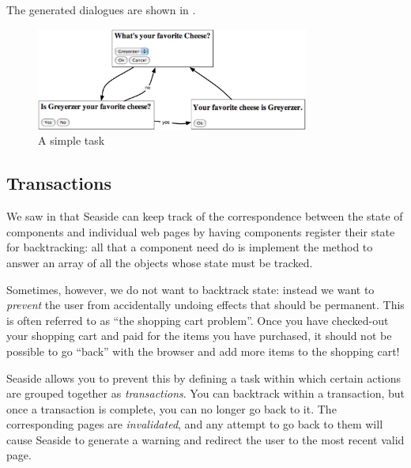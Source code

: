 \documentclass[a4paper,10pt,twoside]{book}
\begin{document}
The generated dialogues are shown in .

\begin{figure}[ht]
\begin{center}
\includegraphics[width=0.8\textwidth]{chooseCheese}
\caption{A simple task}
\label{fig:chooseCheese}
\end{center}
\end{figure}

\subsection{Transactions}

We saw in  that Seaside can keep track of the correspondence between the state of components and individual web pages by having components register their state for backtracking:
all that a component need do is implement the method  to answer an array of all the objects whose state must be tracked.

Sometimes, however, we do not want to backtrack state: instead we want to \emph{prevent} the user from accidentally undoing effects that should be permanent.
This is often referred to as ``the shopping cart problem''.
Once you have checked-out your shopping cart and paid for the items you have purchased, it should not be possible to go ``back'' with the browser and add more items to the shopping cart!

Seaside allows you to prevent this by defining a task within which certain actions are grouped together as \emph{transactions}.
You can backtrack within a transaction, but once a transaction is complete, you can no longer go back to it.
The corresponding pages are \emph{invalidated}, and any attempt to go back to them will cause Seaside to generate a warning and redirect the user to the most recent valid page.
\end{document}
